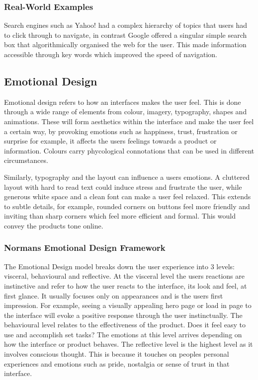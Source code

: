 \documentclass[]{project_final}
\begin{document}
\subsubsection{Real-World Examples}

Search engines such as Yahoo! had a complex hierarchy of topics that users had to click through to navigate, in contrast Google offered a singular simple search box that algorithmically organised the web for the user. This made information accessible through key words which improved the speed of navigation.


\subsection{Emotional Design}

Emotional design refers to how an interfaces makes the user feel. This is done through a wide range of elements from colour, imagery, typography, shapes and animations. These will form aesthetics within the interface and make the user feel a certain way, by provoking emotions such as happiness, trust, frustration or surprise for example, it affects the users feelings towards a product or information. Colours carry phycological connotations that can be used in different circumstances.

Similarly, typography and the layout can influence a users emotions. A cluttered layout with hard to read text could induce stress and frustrate the user, while generous white space and a clean font can make a user feel relaxed. This extends to subtle details, for example, rounded corners on buttons feel more friendly and inviting than sharp corners which feel more efficient and formal. This would convey the products tone online.

\subsubsection{Normans Emotional Design Framework}
The Emotional Design model breaks down the user experience into 3 levels: visceral, behavioural and reflective. At the visceral level the users reactions are instinctive and refer to how the user reacts to the interface, its look and feel, at first glance. It usually focuses only on appearances and is the users first impression. For example, seeing a visually appealing hero page or load in page to the interface will evoke a positive response through the user instinctually.
The behavioural level relates to the effectiveness of the product. Does it feel easy to use and accomplish set tasks? The emotions at this level arrives depending on how the interface or product behaves.
The reflective level is the highest level as it involves conscious thought. This is because it touches on peoples personal experiences and emotions such as pride, nostalgia or sense of trust in that interface.
\end{document}
